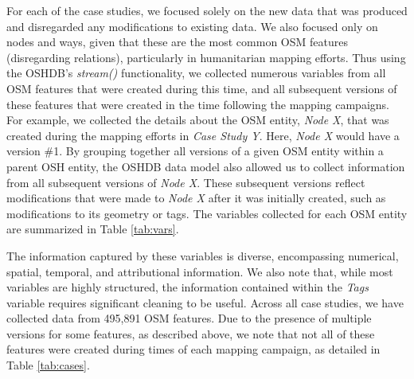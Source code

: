 For each of the case studies, we focused solely on the new data that was produced and disregarded any modifications to existing data. We also focused only on nodes and ways, given that these are the most common OSM features (disregarding relations), particularly in humanitarian mapping efforts. Thus using the OSHDB's \textit{stream()} functionality, we collected numerous variables from all OSM features that were created during this time, and all subsequent versions of these features that were created in the time following the mapping campaigns. For example, we collected the details about the OSM entity, \textit{Node X}, that was created during the mapping efforts in \textit{Case Study Y}. Here, \textit{Node X} would have a version \#1. By grouping together all versions of a given OSM entity within a parent OSH entity, the OSHDB data model also allowed us to collect information from all subsequent versions of \textit{Node X}. These subsequent versions reflect modifications that were made to \textit{Node X} after it was initially created, such as modifications to its geometry or tags. The variables collected for each OSM entity are summarized in Table \ref{tab:vars}. 

The information captured by these variables is diverse, encompassing numerical, spatial, temporal, and attributional information. We also note that, while most variables are highly structured, the information contained within the \textit{Tags} variable requires significant cleaning to be useful. Across all case studies, we have collected data from 495,891 OSM features. Due to the presence of multiple versions for some features, as described above, we note that not all of these features were created during times of each mapping campaign, as detailed in Table \ref{tab:cases}.

